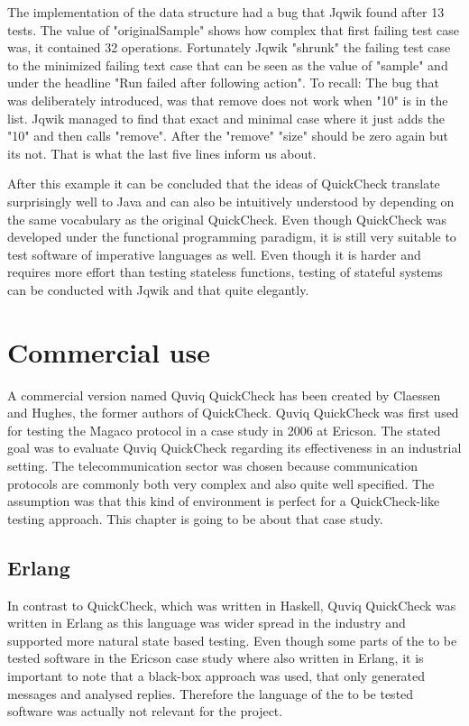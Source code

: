\documentclass[a4paper, 12pt]{article} %
\begin{document}
The implementation of the data structure had a bug that Jqwik found after 13 tests. The value of "originalSample" shows how complex that first failing test case was, it contained 32 operations. Fortunately Jqwik "shrunk" the failing test case to the minimized failing text case that can be seen as the value of "sample" and under the headline "Run failed after following action". To recall: The bug that was deliberately introduced, was that remove does not work when "10" is in the list. Jqwik managed to find that exact and minimal case where it just adds the "10" and then calls "remove". After the "remove" "size" should be zero again but its not. That is what the last five lines inform us about.

After this example it can be concluded that the ideas of QuickCheck translate surprisingly well to Java and can also be intuitively understood by depending on the same vocabulary as the original QuickCheck. Even though QuickCheck was developed under the functional programming paradigm, it is still very suitable to test software of imperative languages as well. Even though it is harder and requires more effort than testing stateless functions, testing of stateful systems can be conducted with Jqwik and that quite elegantly.

\newpage
\section{Commercial use}

A commercial version named Quviq QuickCheck has been created by Claessen and Hughes, the former authors of QuickCheck. Quviq QuickCheck was first used for testing the Magaco protocol in a case study in 2006 at Ericson. The stated goal was to evaluate Quviq QuickCheck regarding its effectiveness in an industrial setting. The telecommunication sector was chosen because communication protocols are commonly both very complex and also quite well specified. The assumption was that this kind of environment is perfect for a QuickCheck-like testing approach. This chapter is going to be about that case study. \cite{Arts06}

\subsection{Erlang}

In contrast to QuickCheck, which was written in Haskell, Quviq QuickCheck was written in Erlang as this language was wider spread in the industry and supported more natural state based testing. Even though some parts of the to be tested software in the Ericson case study where also written in Erlang, it is important to note that a black-box approach was used, that only generated messages and analysed replies. Therefore the language of the to be tested software was actually not relevant for the project. \cite{Arts06} 
\end{document}
